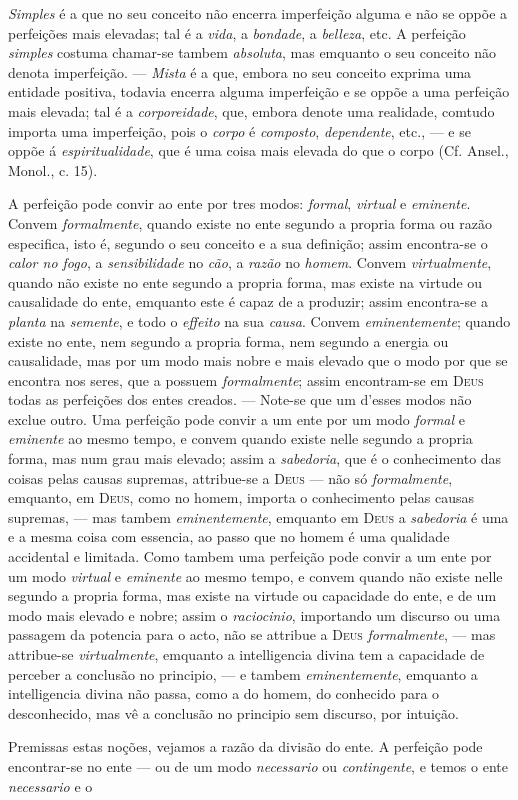\emph{Simples} é a que no seu conceito não encerra imperfeição alguma e não se oppõe a perfeições mais elevadas; tal é a \emph{vida}, a \emph{bondade}, a \emph{belleza}, etc. A perfeição \emph{simples} costuma chamar-se tambem \emph{absoluta}, mas emquanto o seu conceito não denota imperfeição. --- \emph{Mista} é a que, embora no seu conceito exprima uma entidade positiva, todavia encerra alguma imperfeição e se oppõe a uma perfeição mais elevada; tal é a \emph{corporeidade}, que, embora denote uma realidade, comtudo importa uma imperfeição, pois o \emph{corpo} é \emph{composto}, \emph{dependente}, etc., --- e se oppõe á \emph{espiritualidade}, que é uma coisa mais elevada do que o corpo (Cf. Ansel., Monol., c. 15).\par A perfeição pode convir ao ente por tres modos: \emph{formal}, \emph{virtual} e \emph{eminente}. Convem \emph{formalmente}, quando existe no ente segundo a propria forma ou razão especifica, isto é, segundo o seu conceito e a sua definição; assim encontra-se o \emph{calor no fogo}, a \emph{sensibilidade} no \emph{cão}, a \emph{razão} no \emph{homem}. Convem \emph{virtualmente}, quando não existe no ente segundo a propria forma, mas existe na virtude ou causalidade do ente, emquanto este é capaz de a produzir; assim encontra-se a \emph{planta} na \emph{semente}, e todo o \emph{effeito} na sua \emph{causa}. Convem \emph{eminentemente}; quando existe no ente, nem segundo a propria forma, nem segundo a energia ou causalidade, mas por um modo mais nobre e mais elevado que o modo por que se encontra nos seres, que a possuem \emph{formalmente}; assim encontram-se em \textsc{Deus} todas as perfeições dos entes creados. --- Note-se que um d'esses modos não exclue outro. Uma perfeição pode convir a um ente por um modo \emph{formal} e \emph{eminente} ao mesmo tempo, e convem quando existe nelle segundo a propria forma, mas num grau mais elevado; assim a \emph{sabedoria}, que é o conhecimento das coisas pelas causas supremas, attribue-se a \textsc{Deus} --- não só \emph{formalmente}, emquanto, em \textsc{Deus}, como no homem, importa o conhecimento pelas causas supremas, --- mas tambem \emph{eminentemente}, emquanto em \textsc{Deus} a \emph{sabedoria} é uma e a mesma coisa com essencia, ao passo que no homem é uma qualidade accidental e limitada. Como tambem uma perfeição pode convir a um ente por um modo \emph{virtual} e \emph{eminente} ao mesmo tempo, e convem quando não existe nelle segundo a propria forma, mas existe na virtude ou capacidade do ente, e de um modo mais elevado e nobre; assim o \emph{raciocinio}, importando um discurso ou uma passagem da potencia para o acto, não se attribue a \textsc{Deus} \emph{formalmente}, --- mas attribue-se \emph{virtualmente}, emquanto a intelligencia divina tem a capacidade de perceber a conclusão no principio, --- e tambem \emph{eminentemente}, emquanto a intelligencia divina não passa, como a do homem, do conhecido para o desconhecido, mas vê a conclusão no principio sem discurso, por intuição.\par Premissas estas noções, vejamos a razão da divisão do ente. A perfeição pode encontrar-se no ente --- ou de um modo \emph{necessario} ou \emph{contingente}, e temos o ente \emph{necessario} e o 